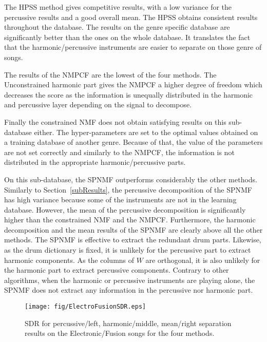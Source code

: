 The HPSS method gives competitive results, with a low variance for the percussive results and a good overall mean. The HPSS obtains consistent results throughout the database. The results on the genre specific database are significantly better than the ones on the whole database. It translates the fact that the harmonic/percussive instruments are easier to separate on those genre of songs. 
 
The results of the NMPCF are the lowest of the four methods. The Unconstrained harmonic part gives the NMPCF a higher degree of freedom which decreases the score as the information is unequally distributed in the harmonic and percussive layer depending on the signal to decompose. 

Finally the constrained NMF does not obtain satisfying results on this sub-database either. The hyper-parameters are set to the optimal values obtained on a training database of another genre. Because of that, the value of the parameters are not set correctly and similarly to the NMPCF, the information is not distributed in the appropriate harmonic/percussive parts. 


On this sub-database, the SPNMF outperforms considerably the other methods. Similarly to Section~\ref{subResults}, the percussive decomposition of the SPNMF has high variance because some of the instruments are not in the learning database. However, the mean of the percussive decomposition is significantly higher than the constrained NMF and the NMPCF. Furthermore, the harmonic decomposition and the mean results of the SPNMF are clearly above all the other methods. The SPNMF is effective to extract the redundant drum parts. Likewise, as the drum dictionary is fixed, it is unlikely for the percussive part to extract harmonic components. As the columns of $W$ are orthogonal, it is also unlikely for the harmonic part to extract percussive components. Contrary to other algorithms, when the harmonic or percussive instruments are playing alone, the SPNMF does not extract any information in the percussive nor harmonic part.



\begin{figure}[htb]

  \centering 
  \texttt{[image: fig/ElectroFusionSDR.eps]}
  \caption{\label{ElectroFusionSDR} SDR for percussive/left, harmonic/middle, mean/right separation results on the Electronic/Fusion songs for the four methods.}
  
\end{figure}

